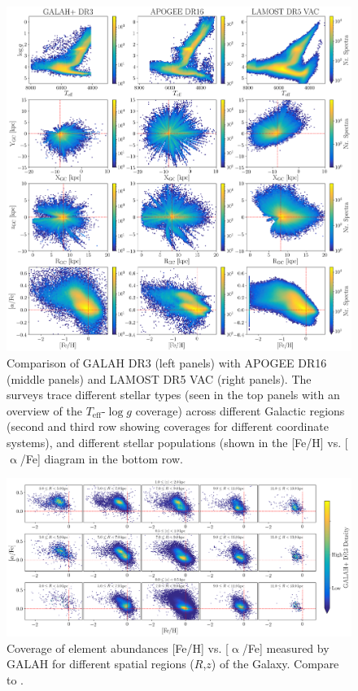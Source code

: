 \documentclass[fleqn,usenatbib,useAMS]{mnras}
\newcommand{\Teff}{$T_\mathrm{eff}$\xspace}
\newcommand{\logg}{$\log g$\xspace}
\begin{document}
\begin{figure}
\centering
\includegraphics[width=\textwidth]{figures/GALAHDR3_APOGEEDR16_LAMOSTDR5VAC.png}
  \caption{Comparison of GALAH DR3 (left panels) with APOGEE DR16 (middle panels) and LAMOST DR5 VAC (right panels). The surveys trace different stellar types (seen in the top panels with an overview of the \Teff-\logg coverage) across different Galactic regions (second and third row showing coverages for different coordinate systems), and different stellar populations (shown in the [Fe/H] vs. [$\upalpha$/Fe] diagram in the bottom row.}
  \label{fig:dr3_apogee_lamost}
\end{figure}

\begin{figure}
\centering
\includegraphics[width=\textwidth]{figures/RZ_alpha.png}
  \caption{Coverage of element abundances [Fe/H] vs. [$\upalpha$/Fe] measured by GALAH for different spatial regions ($R$,$z$) of the Galaxy. Compare to \citet{Hayden2015}.}
  \label{fig:RZ_alpha}
\end{figure}
\end{document}

